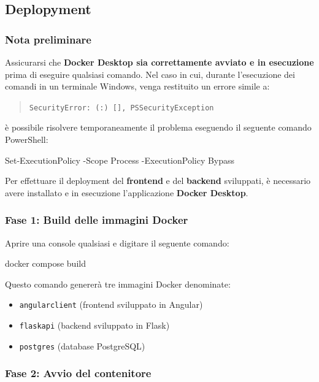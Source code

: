 \subsection{Deplopyment}
\label{subsec:deplopyment}

\subsubsection{Nota preliminare}
Assicurarsi che \textbf{Docker Desktop sia correttamente avviato e in esecuzione} prima di eseguire qualsiasi comando.
\noindent
Nel caso in cui, durante l'esecuzione dei comandi in un terminale Windows, venga restituito un errore simile a:

\begin{quote}
\texttt{SecurityError: (:) [], PSSecurityException}
\end{quote}
\noindent
è possibile risolvere temporaneamente il problema eseguendo il seguente comando PowerShell:


\begin{center}
Set-ExecutionPolicy -Scope Process -ExecutionPolicy Bypass
\end{center}
\noindent
Per effettuare il deployment del \textbf{frontend} e del \textbf{backend} sviluppati, è necessario avere installato e in esecuzione l'applicazione \textbf{Docker Desktop}.

\subsubsection{Fase 1: Build delle immagini Docker}

Aprire una console qualsiasi e digitare il seguente comando:

\begin{center}
docker compose build
\end{center}
\noindent
Questo comando genererà tre immagini Docker denominate:

\begin{itemize}
  \item \texttt{angularclient} \quad (frontend sviluppato in Angular)
  \item \texttt{flaskapi} \quad (backend sviluppato in Flask)
  \item \texttt{postgres} \quad (database PostgreSQL)
\end{itemize}

\subsubsection{Fase 2: Avvio del contenitore}

